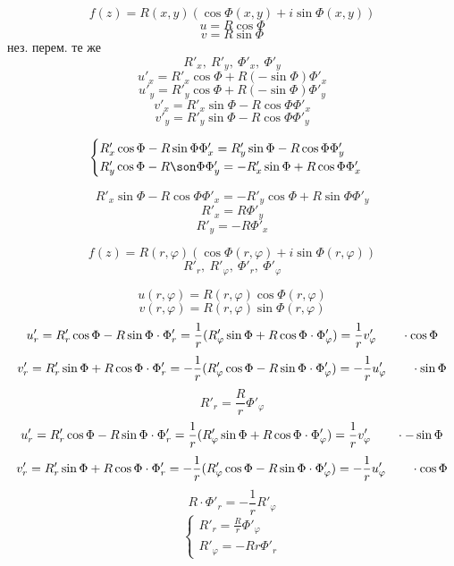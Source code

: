 \documentclass[12pt, fleqn]{article}
\begin{document}
\begin{lect}
   \begin{Task}[4]
        \[f(z) = R(x, y) (\cos \Phi(x, y) + i\sin \Phi(x, y))\]
        \[u = R \cos \Phi\]
        \[v = R \sin \Phi\]
        нез. перем. те же 
        \[R'_x, \ R'_y, \ \Phi'_x, \ \Phi'_y\]
        \[u'_x = R'_x\cos \Phi + R (-\sin \Phi) \Phi'_x\]
        \[u'_y = R'_y \cos \Phi + R(-\sin \Phi) \Phi'_y\]
        \[v'_x = R'_x \sin \Phi - R\cos \Phi \Phi'_x\]
        \[v'_y = R'_y \sin \Phi - R \cos \Phi \Phi'_y\]
      
        \[\begin{cases}
            R'_x \cos \Phi - R\sin \Phi \Phi'_x = R'_y \sin \Phi - R\cos\Phi \Phi'_y\\
            R'_y \cos \Phi - R\son \Phi \Phi'_y = -R'_x \sin \Phi + R\cos \Phi \Phi'_x     
        \end{cases}\]

        \[R'_x \sin \Phi - R\cos \Phi \Phi'_x = - R'_y \cos \Phi + R\sin \Phi \Phi'_y\]
        \[R'_x = R \Phi'_y\]
        \[R'_y = -R\Phi'_x\]
   \end{Task}

   \begin{Task}[4]
       \[f(z) = R(r, \varphi)(\cos\Phi(r, \varphi) + i\sin\Phi(r, \varphi))\]
       \[R'_r, \ R'_\varphi, \ \Phi'_r, \ \Phi'_\varphi\]

       \[u(r, \varphi) = R(r, \varphi) \cos \Phi(r, \varphi)\]
       \[v(r, \varphi) = R(r, \varphi) \sin \Phi(r, \varphi)\]
       \[u'_r = R'_r \cos \Phi - R\sin \Phi \cdot \Phi'_r = \frac{1}{r} (R'_\varphi\sin\Phi + 
       R\cos \Phi \cdot \Phi'_\varphi) = \frac{1}{r}v'_\varphi \qquad \cdot \cos \Phi\]
       \[v'_r = R'_r \sin \Phi + R\cos \Phi \cdot \Phi'_r = -\frac{1}{r}(R'_\varphi\cos\Phi - 
       R\sin \Phi \cdot \Phi'_\varphi) = -\frac{1}{r}u'_\varphi \qquad \cdot \sin \Phi\]
       \[R'_r = \frac{R}{r}\Phi'_\varphi\]
       \[u'_r = R'_r \cos \Phi - R\sin \Phi \cdot \Phi'_r = \frac{1}{r} (R'_\varphi\sin\Phi + 
       R\cos \Phi \cdot \Phi'_\varphi) = \frac{1}{r}v'_\varphi \qquad \cdot -\sin \Phi\]
       \[v'_r = R'_r \sin \Phi + R\cos \Phi \cdot \Phi'_r = -\frac{1}{r}(R'_\varphi\cos\Phi - 
       R\sin \Phi \cdot \Phi'_\varphi) = -\frac{1}{r}u'_\varphi \qquad \cdot \cos \Phi\]
       \[R \cdot \Phi'_r = - \frac{1}{r} R'_\varphi\]
       \[\begin{cases}
           R'_r = \frac{R}{r}\Phi'_\varphi\\
           R'_\varphi = - Rr \Phi'_r
       \end{cases}\]
   \end{Task}


\end{lect}
\end{document}
